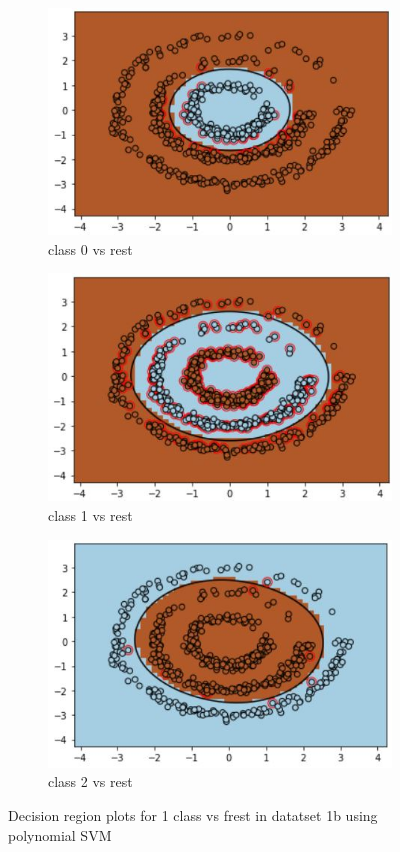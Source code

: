 \documentclass[11pt]{article}
\begin{document}
\begin{figure}[h!]
\centering
	\begin{subfigure}[b]{0.45\textwidth}
	\centering
	\includegraphics[scale=0.7]{dataset1b_poly_svm_0_ds.jpg}
	\caption{class 0 vs rest}
	\label{fig:fig2.2.4.1}
	\end{subfigure}
	\begin{subfigure}[b]{0.45\textwidth}
	\centering
	\includegraphics[scale=0.7]{dataset1b_poly_svm_1_ds.jpg}
	\caption{class 1 vs rest}
	\label{fig:fig2.2.4.2}
	\end{subfigure}
	\begin{subfigure}[b]{0.45\textwidth}
	\centering
	\includegraphics[scale=0.7]{dataset1b_poly_svm_2_ds.jpg}
	\caption{class 2 vs rest}
	\label{fig:fig2.2.4.3}
	\end{subfigure}
\caption{Decision region plots for 1 class vs frest in datatset 1b using polynomial SVM}
\label{fig:fig2.2.4}
\end{figure}
\end{document}
